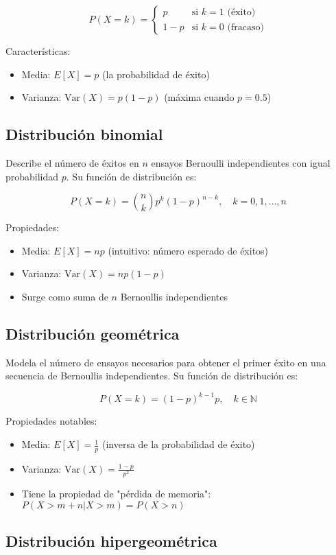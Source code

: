 \documentclass[letterpaper, 12pt]{article}
\begin{document}
	\[ P(X = k) = \begin{cases}
		p & \text{si } k = 1 \text{ (éxito)} \\
		1-p & \text{si } k = 0 \text{ (fracaso)}
	\end{cases} \]
	
	Características:
	\begin{itemize}
		\item Media: $E[X] = p$ (la probabilidad de éxito)
		\item Varianza: $\text{Var}(X) = p(1-p)$ (máxima cuando $p=0.5$)
	\end{itemize}
	
	\subsection{Distribución binomial}
	Describe el número de éxitos en $n$ ensayos Bernoulli independientes con igual probabilidad $p$. Su función de distribución es:
	
	\[ P(X = k) = \binom{n}{k} p^k (1-p)^{n-k}, \quad k = 0,1,\dots,n \]
	
	Propiedades:
	\begin{itemize}
		\item Media: $E[X] = np$ (intuitivo: número esperado de éxitos)
		\item Varianza: $\text{Var}(X) = np(1-p)$
		\item Surge como suma de $n$ Bernoullis independientes
	\end{itemize}
	
	\subsection{Distribución geométrica}
	Modela el número de ensayos necesarios para obtener el primer éxito en una secuencia de Bernoullis independientes. Su función de distribución es:
	
	\[ P(X = k) = (1-p)^{k-1} p, \quad k \in \mathbb{N} \]
	
	Propiedades notables:
	\begin{itemize}
		\item Media: $E[X] = \frac{1}{p}$ (inversa de la probabilidad de éxito)
		\item Varianza: $\text{Var}(X) = \frac{1-p}{p^2}$
		\item Tiene la propiedad de "pérdida de memoria": $P(X > m+n | X > m) = P(X > n)$
	\end{itemize}
	
	\subsection{Distribución hipergeométrica}
	
\end{document}
